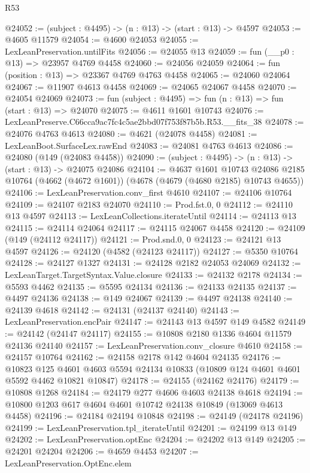 \begin{lexlean}{R53}
\begin{coremodule}
@24052 := (subject : @4495) -> (n : @13) -> (start : @13) -> @4597
@24053 := @4605 @11579
@24054 := @4600 @24053
@24055 := LexLeanPreservation.untilFits
@24056 := @24055 @13
@24059 := fun (__p0 : @13) => @23957 @4769 @4458
@24060 := @24056 @24059
@24064 := fun (position : @13) => @23367 @4769 @4763 @4458
@24065 := @24060 @24064
@24067 := @11907 @4613 @4458
@24069 := @24065 @24067 @4458
@24070 := @24054 @24069
@24073 := fun (subject : @4495) => fun (n : @13) => fun (start : @13) => @24070
@24075 := @4611 @1601 @10743
@24076 := LexLeanPreserve.C66cca9ac7fc4c5ae2bbd07f753f87b5b.R53.__fits_38
@24078 := @24076 @4763 @4613
@24080 := @4621 (@24078 @4458)
@24081 := LexLeanBoot.SurfaceLex.rawEnd
@24083 := @24081 @4763 @4613
@24086 := @24080 (@149 (@24083 @4458))
@24090 := (subject : @4495) -> (n : @13) -> (start : @13) -> @24075 @24086
@24104 := @4637
    @1601
    @10743
    @24086
    @2185
    @10764
    (@4662 (@4672 @1601))
    (@4678 (@4679 (@4680 @2185) @10743 @4655))
@24106 := LexLeanPreservation.conv_first @4610
@24107 := @24106 @10764
@24109 := @24107 @2183 @24070
@24110 := Prod.fst.{0, 0}
@24112 := @24110 @13 @4597
@24113 := LexLeanCollections.iterateUntil
@24114 := @24113 @13
@24115 := @24114 @24064
@24117 := @24115 @24067 @4458
@24120 := @24109 (@149 (@24112 @24117))
@24121 := Prod.snd.{0, 0}
@24123 := @24121 @13 @4597
@24126 := @24120 (@4582 (@24123 @24117))
@24127 := @5350 @10764
@24128 := @24127 @1327
@24131 := @24128 @2182 @24053 @24069
@24132 := LexLeanTarget.TargetSyntax.Value.closure
@24133 := @24132 @2178
@24134 := @5593 @4462
@24135 := @5595 @24134
@24136 := @24133 @24135
@24137 := @4497 @24136
@24138 := @149 @24067
@24139 := @4497 @24138
@24140 := @24139 @4618
@24142 := @24131 (@24137 @24140)
@24143 := LexLeanPreservation.encPair
@24147 := @24143 @13 @4597 @149 @4582
@24149 := @24142 (@24147 @24117)
@24155 := @10808 @2180 @1336 @4604 @11579 @24136 @24140
@24157 := LexLeanPreservation.conv_closure @4610
@24158 := @24157 @10764
@24162 := @24158 @2178 @142 @4604 @24135
@24176 := @10823
    @125
    @4601
    @4603
    @5594
    @24134
    @10833
    (@10809 @124 @4601 @4601 @5592 @4462 @10821 @10847)
@24178 := @24155 (@24162 @24176)
@24179 := @10808 @1268
@24184 := @24179 @277 @4606 @4603 @24138 @4618
@24194 := @10800 @1203 @617 @4604 @4601 @10742 @24138 @10849 (@13069 @4613 @4458)
@24196 := @24184 @24194 @10848
@24198 := @24149 (@24178 @24196)
@24199 := LexLeanPreservation.tpl_iterateUntil
@24201 := @24199 @13 @149
@24202 := LexLeanPreservation.optEnc
@24204 := @24202 @13 @149
@24205 := @24201 @24204
@24206 := @4659 @4453
@24207 := LexLeanPreservation.OptEnc.elem

\end{coremodule}
\end{lexlean}
